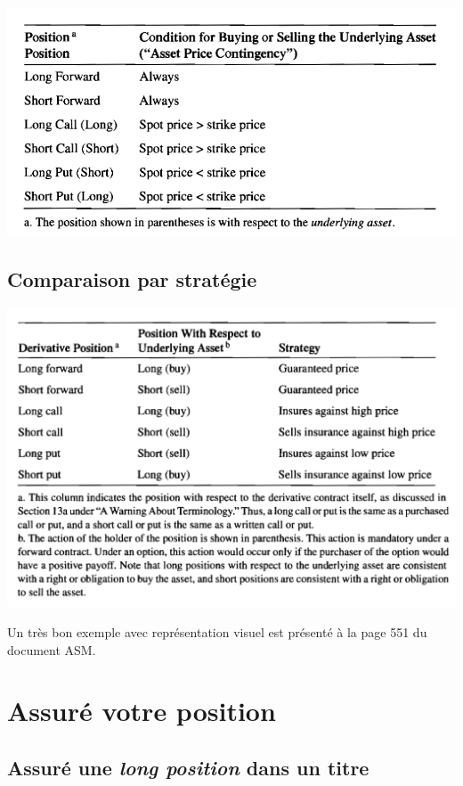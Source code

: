 \documentclass[11pt,french]{report}
\begin{document}
\includegraphics[scale=0.55]{picture22.PNG}

\section{Comparaison par stratégie}
\label{sec:comparaison par stratégie}

\includegraphics[scale=0.55]{picture23.PNG}

Un très bon exemple avec représentation visuel est présenté à la page 551 du document ASM.




\chapter{Assuré votre position}
\label{chap:assrué position}


\section{Assuré une \emph{long position} dans un titre}
\end{document}
